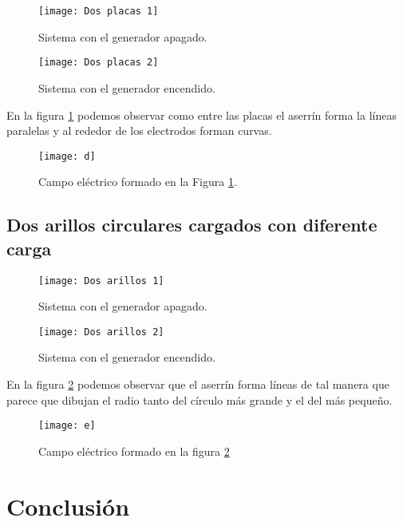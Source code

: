 \documentclass[14pt]{article}
\begin{document}
\begin{figure}[h!]
	\centering
	\texttt{[image: Dos placas 1]}
	\caption{Sistema con el generador apagado.}
\end{figure}

\begin{figure}[h!]
	\centering
	\texttt{[image: Dos placas 2]}
	\caption{Sistema con el generador encendido.}
	\label{fig:DosPlacas}
\end{figure}

En la figura \ref{fig:DosPlacas} podemos observar como entre las placas el aserrín forma la líneas paralelas y al rededor de los electrodos forman curvas.

\begin{figure}[h!]
	\centering
	\texttt{[image: d]}
	\caption{Campo eléctrico formado en la Figura \ref{fig:DosPlacas}.}
\end{figure}

\newpage
\subsection{Dos arillos circulares cargados con diferente carga}

\begin{figure}[h!]
	\centering
	\texttt{[image: Dos arillos 1]}
	\caption{Sistema con el generador apagado.}
\end{figure}

\begin{figure}[h!]
	\centering
	\texttt{[image: Dos arillos 2]}
	\caption{Sistema con el generador encendido.}
	\label{fig:DosArillos}
\end{figure}

En la figura \ref{fig:DosArillos} podemos observar que el aserrín forma líneas de tal manera que parece que dibujan el radio tanto del círculo más grande y el del más pequeño.

\begin{figure}[h!]
	\centering
	\texttt{[image: e]}
	\caption{Campo eléctrico formado en la figura \ref{fig:DosArillos}}
\end{figure}





\section{Conclusión}
\end{document}
